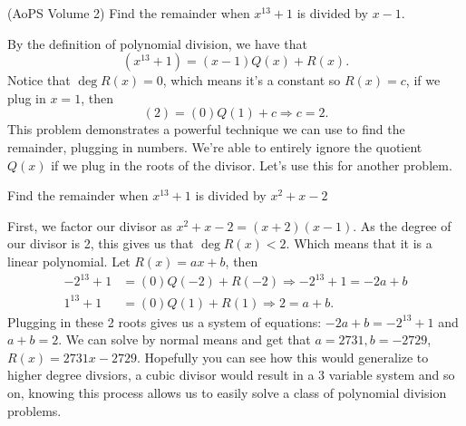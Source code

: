 \documentclass[11pt]{article}
\begin{document}
\begin{example}{(AoPS Volume 2)}
Find the remainder when $x^{13}+1$ is divided by $x-1$.
\end{example}
By the definition of polynomial division, we have that
\[
    (x^{13}+1) = (x-1)Q(x) + R(x).
\] Notice that $\deg R(x) = 0$, which means it's a constant so $R(x)=c$, if we plug in $x=1$, then
\[
(2)=(0)Q(1) + c \Longrightarrow c=2.
\]
This problem demonstrates a powerful technique we can use to find the remainder, plugging in numbers. We're able to entirely ignore the quotient $Q(x)$ if we plug in the roots of the divisor. Let's use this for another problem.
\begin{example}
    Find the remainder when $x^{13}+1$ is divided by $x^2+x-2$
\end{example}
First, we factor our divisor as $x^2+x-2 = (x+2)(x-1)$. As the degree of our divisor is 2, this gives us that $\deg R(x) < 2$. Which means that it is a linear polynomial. Let $R(x) = ax+b$, then
\begin{equation*}
    \begin{aligned}
    -2^{13} + 1  & = (0)Q(-2) + R(-2) \Longrightarrow -2^{13}+1 = -2a + b \\
        1^{13} + 1 & = (0)Q(1) + R(1) \Longrightarrow 2 = a+b.
    \end{aligned}
\end{equation*}
Plugging in these 2 roots gives us a system of equations: $-2a+b = -2^{13} + 1$ and $a+b = 2$. We can solve by normal means and get that $a=2731, b = -2729$, $R(x) = 2731x - 2729$. Hopefully you can see how this would generalize to higher degree divsiors, a cubic divisor would result in a 3 variable system and so on, knowing this process allows us to easily solve a class of polynomial division problems. 
\end{document}
